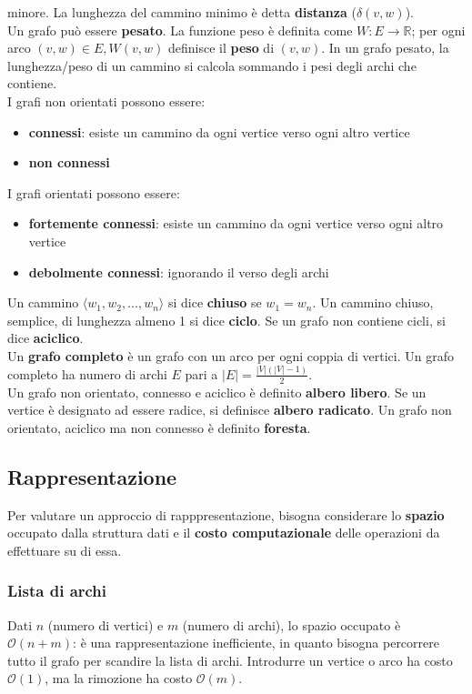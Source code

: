 \documentclass[11pt]{article}
\begin{document}
minore. La lunghezza del cammino minimo è detta \textbf{distanza} ($\delta (v,w)$).\\
Un grafo può essere \textbf{pesato}. La funzione peso è definita come $W:E\rightarrow \mathbb{R}$; per ogni arco
$(v,w)\in E,W(v,w)$ definisce il \textbf{peso} di $(v,w)$. In un grafo pesato, la lunghezza/peso di un cammino si calcola 
sommando i pesi degli archi che contiene.\\
I grafi non orientati possono essere:
\begin{itemize}
    \item \textbf{connessi}: esiste un cammino da ogni vertice verso ogni altro vertice
    \item \textbf{non connessi}
\end{itemize}
I grafi orientati possono essere:
\begin{itemize}
    \item \textbf{fortemente connessi}: esiste un cammino da ogni vertice verso ogni altro vertice
    \item \textbf{debolmente connessi}: ignorando il verso degli archi
\end{itemize}
Un cammino $\langle w_1,w_2,...,w_n \rangle$ si dice \textbf{chiuso} se $w_1=w_n$. Un cammino chiuso, semplice, di lunghezza 
almeno 1 si dice \textbf{ciclo}. Se un grafo non contiene cicli, si dice \textbf{aciclico}.\\
Un \textbf{grafo completo} è un grafo con un arco per ogni coppia di vertici. Un grafo completo ha numero di archi $E$ pari 
a $|E| = \frac{|V|(|V|-1)}{2}$.\\
Un grafo non orientato, connesso e aciclico è definito \textbf{albero libero}. Se un vertice è designato ad essere radice, 
si definisce \textbf{albero radicato}. Un grafo non orientato, aciclico ma non connesso è definito \textbf{foresta}.
\subsection{Rappresentazione}
Per valutare un approccio di rapppresentazione, bisogna considerare lo \textbf{spazio} occupato dalla struttura dati e il 
\textbf{costo computazionale} delle operazioni da effettuare su di essa.
\subsubsection{Lista di archi}
Dati $n$ (numero di vertici) e $m$ (numero di archi), lo spazio occupato è $\mathcal{O}(n+m)$: è una rappresentazione 
inefficiente, in quanto bisogna percorrere tutto il grafo per scandire la lista di archi. Introdurre un vertice o arco ha 
costo $\mathcal{O}(1)$, ma la rimozione ha costo $\mathcal{O}(m)$.
\end{document}
